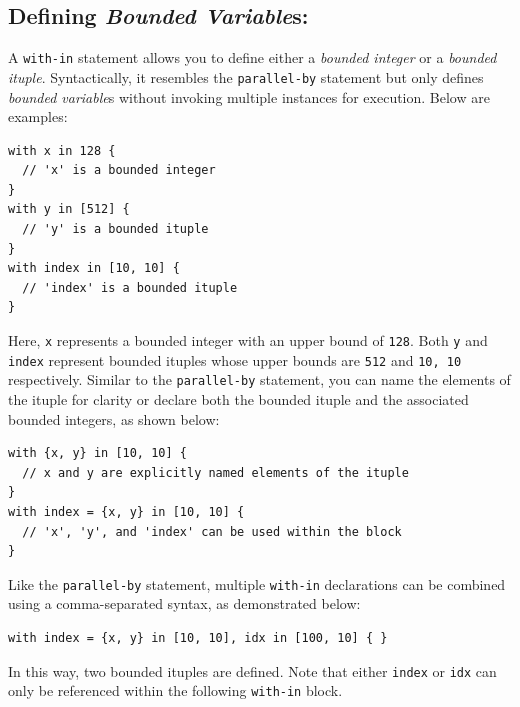 \subsection*{Defining \emph{Bounded Variable}s:}

A \texttt{with-in} statement allows you to define either a \emph{bounded integer} or a \emph{bounded ituple}. Syntactically, it resembles the \texttt{parallel-by} statement but only defines \emph{bounded variable}s without invoking multiple instances for execution. Below are examples:

\begin{lstlisting}[language=croqtile,caption={A bounded variable}]
with x in 128 {
  // 'x' is a bounded integer
}
with y in [512] {
  // 'y' is a bounded ituple
}
with index in [10, 10] {
  // 'index' is a bounded ituple
}
\end{lstlisting}

Here, \texttt{x} represents a bounded integer with an upper bound of \texttt{128}. Both \texttt{y} and \texttt{index} represent bounded ituples whose upper bounds are \texttt{512} and \texttt{10, 10} respectively. Similar to the \texttt{parallel-by} statement, you can name the elements of the ituple for clarity or declare both the bounded ituple and the associated bounded integers, as shown below:

\begin{lstlisting}[language=croqtile,caption={A tuple of bounded variables}]
with {x, y} in [10, 10] {
  // x and y are explicitly named elements of the ituple
}
with index = {x, y} in [10, 10] {
  // 'x', 'y', and 'index' can be used within the block
}
\end{lstlisting}

Like the \texttt{parallel-by} statement, multiple \texttt{with-in} declarations can be combined using a comma-separated syntax, as demonstrated below:

\begin{lstlisting}[language=croqtile,caption={A variable derived from a tuple}]
with index = {x, y} in [10, 10], idx in [100, 10] { }
\end{lstlisting}

In this way, two bounded ituples are defined. Note that either \texttt{index} or \texttt{idx} can only be referenced within the following \texttt{with-in} block.
